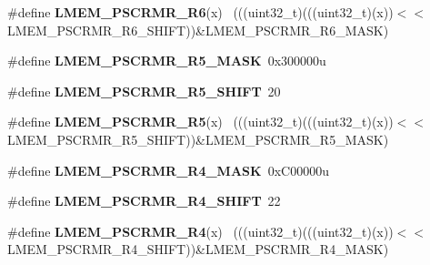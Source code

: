 \begin{DoxyCompactItemize}
\item 
\hypertarget{group___l_m_e_m___register___masks_ga681e4bb6a2d96b6ab2e816dde4f66c9c}{}\#define {\bfseries L\+M\+E\+M\+\_\+\+P\+S\+C\+R\+M\+R\+\_\+\+R6}(x)                                            ~(((uint32\+\_\+t)(((uint32\+\_\+t)(x))$<$$<$L\+M\+E\+M\+\_\+\+P\+S\+C\+R\+M\+R\+\_\+\+R6\+\_\+\+S\+H\+I\+F\+T))\&L\+M\+E\+M\+\_\+\+P\+S\+C\+R\+M\+R\+\_\+\+R6\+\_\+\+M\+A\+S\+K)\label{group___l_m_e_m___register___masks_ga681e4bb6a2d96b6ab2e816dde4f66c9c}

\item 
\hypertarget{group___l_m_e_m___register___masks_ga3d387c36b8a1105fe7086b28d60a8525}{}\#define {\bfseries L\+M\+E\+M\+\_\+\+P\+S\+C\+R\+M\+R\+\_\+\+R5\+\_\+\+M\+A\+S\+K}~0x300000u\label{group___l_m_e_m___register___masks_ga3d387c36b8a1105fe7086b28d60a8525}

\item 
\hypertarget{group___l_m_e_m___register___masks_ga7107c449ce5fc9db61ecdfb8e5800914}{}\#define {\bfseries L\+M\+E\+M\+\_\+\+P\+S\+C\+R\+M\+R\+\_\+\+R5\+\_\+\+S\+H\+I\+F\+T}~20\label{group___l_m_e_m___register___masks_ga7107c449ce5fc9db61ecdfb8e5800914}

\item 
\hypertarget{group___l_m_e_m___register___masks_ga23e76a64a78665a9041850c5b854c31c}{}\#define {\bfseries L\+M\+E\+M\+\_\+\+P\+S\+C\+R\+M\+R\+\_\+\+R5}(x)                                            ~(((uint32\+\_\+t)(((uint32\+\_\+t)(x))$<$$<$L\+M\+E\+M\+\_\+\+P\+S\+C\+R\+M\+R\+\_\+\+R5\+\_\+\+S\+H\+I\+F\+T))\&L\+M\+E\+M\+\_\+\+P\+S\+C\+R\+M\+R\+\_\+\+R5\+\_\+\+M\+A\+S\+K)\label{group___l_m_e_m___register___masks_ga23e76a64a78665a9041850c5b854c31c}

\item 
\hypertarget{group___l_m_e_m___register___masks_ga24370d64c0aaa4af59b9446c48f44d18}{}\#define {\bfseries L\+M\+E\+M\+\_\+\+P\+S\+C\+R\+M\+R\+\_\+\+R4\+\_\+\+M\+A\+S\+K}~0x\+C00000u\label{group___l_m_e_m___register___masks_ga24370d64c0aaa4af59b9446c48f44d18}

\item 
\hypertarget{group___l_m_e_m___register___masks_ga689e2d06c9d2609c9084d431244a5f3f}{}\#define {\bfseries L\+M\+E\+M\+\_\+\+P\+S\+C\+R\+M\+R\+\_\+\+R4\+\_\+\+S\+H\+I\+F\+T}~22\label{group___l_m_e_m___register___masks_ga689e2d06c9d2609c9084d431244a5f3f}

\item 
\hypertarget{group___l_m_e_m___register___masks_gaba3872e012f0641292013a9bca6991c9}{}\#define {\bfseries L\+M\+E\+M\+\_\+\+P\+S\+C\+R\+M\+R\+\_\+\+R4}(x)                                            ~(((uint32\+\_\+t)(((uint32\+\_\+t)(x))$<$$<$L\+M\+E\+M\+\_\+\+P\+S\+C\+R\+M\+R\+\_\+\+R4\+\_\+\+S\+H\+I\+F\+T))\&L\+M\+E\+M\+\_\+\+P\+S\+C\+R\+M\+R\+\_\+\+R4\+\_\+\+M\+A\+S\+K)\label{group___l_m_e_m___register___masks_gaba3872e012f0641292013a9bca6991c9}


\end{DoxyCompactItemize}
